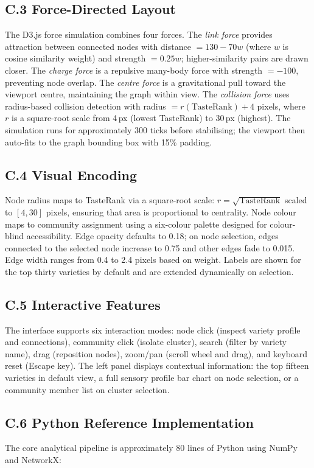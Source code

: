 \documentclass[11pt]{article}
\begin{document}
\subsection*{C.3 Force-Directed Layout}
The D3.js force simulation combines four forces. The \emph{link force} provides attraction between connected nodes with distance $= 130 - 70w$ (where $w$ is cosine similarity weight) and strength $= 0.25w$; higher-similarity pairs are drawn closer. The \emph{charge force} is a repulsive many-body force with strength $= -100$, preventing node overlap. The \emph{centre force} is a gravitational pull toward the viewport centre, maintaining the graph within view. The \emph{collision force} uses radius-based collision detection with radius $= r(\mathrm{TasteRank}) + 4$ pixels, where $r$ is a square-root scale from 4\,px (lowest TasteRank) to 30\,px (highest). The simulation runs for approximately 300 ticks before stabilising; the viewport then auto-fits to the graph bounding box with 15\% padding.

\subsection*{C.4 Visual Encoding}
Node radius maps to TasteRank via a square-root scale: $r = \sqrt{\mathrm{TasteRank}}$ scaled to $[4, 30]$ pixels, ensuring that area is proportional to centrality. Node colour maps to community assignment using a six-colour palette designed for colour-blind accessibility. Edge opacity defaults to 0.18; on node selection, edges connected to the selected node increase to 0.75 and other edges fade to 0.015. Edge width ranges from 0.4 to 2.4 pixels based on weight. Labels are shown for the top thirty varieties by default and are extended dynamically on selection.

\subsection*{C.5 Interactive Features}
The interface supports six interaction modes: node click (inspect variety profile and connections), community click (isolate cluster), search (filter by variety name), drag (reposition nodes), zoom/pan (scroll wheel and drag), and keyboard reset (Escape key). The left panel displays contextual information: the top fifteen varieties in default view, a full sensory profile bar chart on node selection, or a community member list on cluster selection.

\subsection*{C.6 Python Reference Implementation}
The core analytical pipeline is approximately 80 lines of Python using NumPy and NetworkX:
\end{document}
